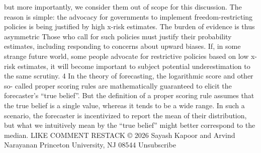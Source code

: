 but more importantly, we consider them out of scope for this
discussion. The reason is simple: the advocacy for governments
to implement freedom-restricting policies is being justiﬁed by
high x-risk estimates. The burden of evidence is thus asymmetric
Those who call for such policies must justify their probability
estimates, including responding to concerns about upward
biases. If, in some strange future world, some people advocate
for restrictive policies based on low x-risk estimates, it will
become important to subject potential underestimation to the
same scrutiny.
4
In the theory of forecasting, the logarithmic score and other so-
called proper scoring rules are mathematically guaranteed to
elicit the forecaster’s “true belief”. But the deﬁnition of a proper
scoring rule assumes that the true belief is a single value,
whereas it tends to be a wide range. In such a scenario, the
forecaster is incentivized to report the mean of their distribution,
but what we intuitively mean by the “true belief” might better
correspond to the median.
LIKE
COMMENT
RESTACK
© 2026 Sayash Kapoor and Arvind Narayanan
Princeton University, NJ 08544
Unsubscribe

